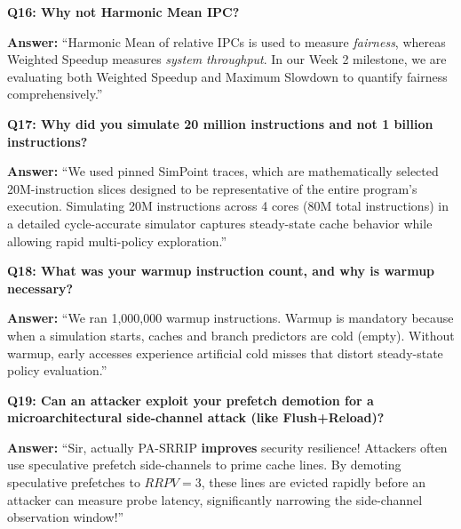\documentclass[11pt, a4paper]{article}
\begin{document}
\begin{trapbox}
\textbf{Q16: Why not Harmonic Mean IPC?}
\end{trapbox}
\begin{answerbox}
\textbf{Answer:} ``Harmonic Mean of relative IPCs is used to measure \textit{fairness}, whereas Weighted Speedup measures \textit{system throughput}. In our Week 2 milestone, we are evaluating both Weighted Speedup and Maximum Slowdown to quantify fairness comprehensively.''
\end{answerbox}

\begin{trapbox}
\textbf{Q17: Why did you simulate 20 million instructions and not 1 billion instructions?}
\end{trapbox}
\begin{answerbox}
\textbf{Answer:} ``We used pinned SimPoint traces, which are mathematically selected 20M-instruction slices designed to be representative of the entire program's execution. Simulating 20M instructions across 4 cores (80M total instructions) in a detailed cycle-accurate simulator captures steady-state cache behavior while allowing rapid multi-policy exploration.''
\end{answerbox}

\begin{trapbox}
\textbf{Q18: What was your warmup instruction count, and why is warmup necessary?}
\end{trapbox}
\begin{answerbox}
\textbf{Answer:} ``We ran 1,000,000 warmup instructions. Warmup is mandatory because when a simulation starts, caches and branch predictors are cold (empty). Without warmup, early accesses experience artificial cold misses that distort steady-state policy evaluation.''
\end{answerbox}

\begin{trapbox}
\textbf{Q19: Can an attacker exploit your prefetch demotion for a microarchitectural side-channel attack (like Flush+Reload)?}
\end{trapbox}
\begin{answerbox}
\textbf{Answer:} ``Sir, actually PA-SRRIP \textbf{improves} security resilience! Attackers often use speculative prefetch side-channels to prime cache lines. By demoting speculative prefetches to $RRPV=3$, these lines are evicted rapidly before an attacker can measure probe latency, significantly narrowing the side-channel observation window!''
\end{answerbox}
\end{document}
